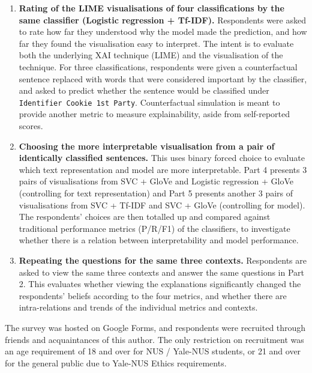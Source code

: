\begin{enumerate}
	\item \textbf{Rating of the LIME visualisations of four classifications by the same classifier (Logistic regression + Tf-IDF).} Respondents were asked to rate how far they understood why the model made the prediction, and how far they found the visualisation easy to interpret. The intent is to evaluate both the underlying XAI technique (LIME) and the visualisation of the technique. For three classifications, respondents were given a counterfactual sentence replaced with words that were considered important by the classifier, and asked to predict whether the sentence would be classified under \texttt{Identifier Cookie 1st Party}. Counterfactual simulation is meant to provide another metric to measure explainability, aside from self-reported scores.
	\item \textbf{Choosing the more interpretable visualisation from a pair of identically classified sentences.} This uses binary forced choice to evaluate which text representation and model are more interpretable. Part 4 presents 3 pairs of visualisations from SVC + GloVe and Logistic regression + GloVe (controlling for text representation) and Part 5 presents another 3 pairs of visualisations from SVC + Tf-IDF and SVC + GloVe (controlling for model). The  respondents' choices are then totalled up and compared against traditional performance metrics (P/R/F1) of the classifiers, to investigate whether there is a relation between interpretability and model performance.
	\item \textbf{Repeating the questions for the same three contexts.} Respondents are asked to view the same three contexts and answer the same questions in Part 2. This evaluates whether viewing the explanations significantly changed the respondents' beliefs according to the four metrics, and whether there are intra-relations and trends of the individual metrics and contexts.
\end{enumerate}

The survey was hosted on Google Forms, and respondents were recruited through friends and acquaintances of this author. The only restriction on recruitment was an age requirement of 18 and over for NUS / Yale-NUS students, or 21 and over for the general public due to Yale-NUS Ethics requirements.